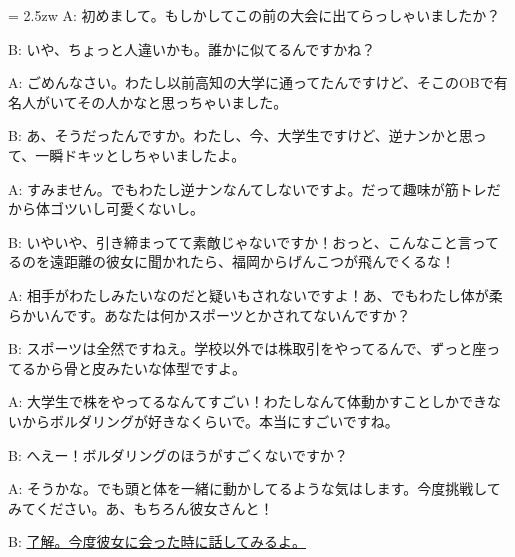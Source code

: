 \documentclass[11pt]{amsart}
\title{}
\author{}
\newenvironment{hangall}[1]{\hangindent = 2.5zw\everypar{\hangindent = 2.5zw}}{}
\begin{document}
\maketitle
\begin{hangall}{}%
A: 初めまして。もしかしてこの前の大会に出てらっしゃいましたか？

B: いや、ちょっと人違いかも。誰かに似てるんですかね？

A: ごめんなさい。わたし以前高知の大学に通ってたんですけど、そこのOBで有名人がいてその人かなと思っちゃいました。

B: あ、そうだったんですか。わたし、今、大学生ですけど、逆ナンかと思って、一瞬ドキッとしちゃいましたよ。

A: すみません。でもわたし逆ナンなんてしないですよ。だって趣味が筋トレだから体ゴツいし可愛くないし。

B: いやいや、引き締まってて素敵じゃないですか！おっと、こんなこと言ってるのを遠距離の彼女に聞かれたら、福岡からげんこつが飛んでくるな！

A: 相手がわたしみたいなのだと疑いもされないですよ！あ、でもわたし体が柔らかいんです。あなたは何かスポーツとかされてないんですか？

B: スポーツは全然ですねえ。学校以外では株取引をやってるんで、ずっと座ってるから骨と皮みたいな体型ですよ。

A: 大学生で株をやってるなんてすごい！わたしなんて体動かすことしかできないからボルダリングが好きなくらいで。本当にすごいですね。

B: へえー！ボルダリングのほうがすごくないですか？

A: そうかな。でも頭と体を一緒に動かしてるような気はします。今度挑戦してみてください。あ、もちろん彼女さんと！

B: \ul{了解。今度彼女に会った時に話してみるよ。}\end{hangall}
\end{document}
